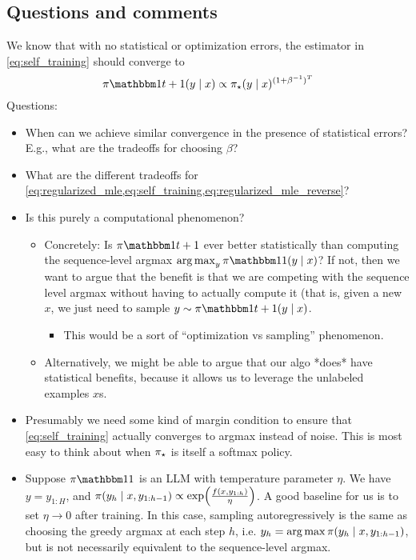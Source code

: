 \documentclass{article}
\newcommand{\dfc}[1]{\dfcomment{#1}}
\begin{document}
\subsection{Questions and comments}
We know that with no statistical or optimization errors, the estimator
in \cref{eq:self_training} should converge to
  \[
    \pi\ind{t+1}(y\mid{}x)\propto{}\pistar(y\mid{}x)^{(1+\beta^{-1})^{T}}
  \]
  Questions:
\begin{itemize}
\item When can we achieve similar convergence in the presence of
  statistical errors? E.g., what are the tradeoffs for choosing $\beta$?
\item What are the different tradeoffs for \cref{eq:regularized_mle,eq:self_training,eq:regularized_mle_reverse}?
\item Is this purely a computational phenomenon?
  \begin{itemize}
  \item Concretely: Is $\pi\ind{t+1}$ ever better statistically than
    computing the sequence-level argmax
    $\argmax_{y}\pi\ind{1}(y\mid{}x)$? If not, then we want to argue
    that the benefit is that we are competing with the sequence level
    argmax without having to actually compute it (that is, given a new
    $x$, we just need to sample $y\sim{}\pi\ind{t+1}(y\mid{}x)$.
    \begin{itemize}
    \item This would be a sort of ``optimization vs sampling'' phenomenon.
    \end{itemize}
  \item Alternatively, we might be able to argue that our algo *does*
    have statistical benefits, because it allows us to leverage the
    unlabeled examples $x$s.
  \end{itemize}
\item Presumably we need some kind of margin condition to ensure that
  \cref{eq:self_training} actually converges to argmax instead of
  noise. This is most easy to think about when $\pi_{\star}$ is itself a
  softmax policy.
\item Suppose $\pi\ind{1}$ is an LLM with temperature parameter
  $\eta$. We have $y=y_{1:H}$, and
  $\pi(y_h\mid{}x,y_{1:h-1})\propto\exp\prn*{\frac{f(x,y_{1:h})}{\eta}}$. A
  good baseline for us is to set $\eta\to{}0$ after training. In this
  case, sampling autoregressively is the same as choosing the greedy
  argmax at each step $h$,
  i.e. $y_h=\operatorname*{arg\,max}{}\pi(y_h\mid{}x,y_{1:h-1})$, but is not
  necessarily equivalent to the sequence-level argmax.

\end{itemize}
\end{document}
